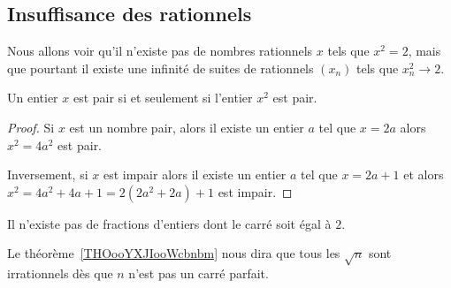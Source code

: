 \subsection{Insuffisance des rationnels}

Nous allons voir qu'il n'existe pas de nombres rationnels \( x\) tels que \( x^2=2\), mais que pourtant il existe une infinité de suites de rationnels \( (x_n)\) tels que \(  x_n^2\to 2  \).

\begin{lemma}       \label{LemJPIUooWFHaFM}
    Un entier \( x\) est pair si et seulement si l'entier \( x^2\) est pair.
\end{lemma}

\begin{proof}
    Si \( x\) est un nombre pair, alors il existe un entier \( a\) tel que \( x=2a\) alors \( x^2=4a^2\) est pair.

    Inversement, si \( x\) est impair alors il existe un entier \( a\) tel que \( x=2a+1\) et alors \( x^2=4a^2+4a+1=2(2a^2+2a)+1\) est impair.
\end{proof}

\begin{proposition}     \label{PropooRJMSooPrdeJb}
    Il n'existe pas de fractions d'entiers dont le carré soit égal à \( 2\).
\end{proposition}
Le théorème~\ref{THOooYXJIooWcbnbm} nous dira que tous les \( \sqrt{n}\) sont irrationnels dès que \( n\) n'est pas un carré parfait.

